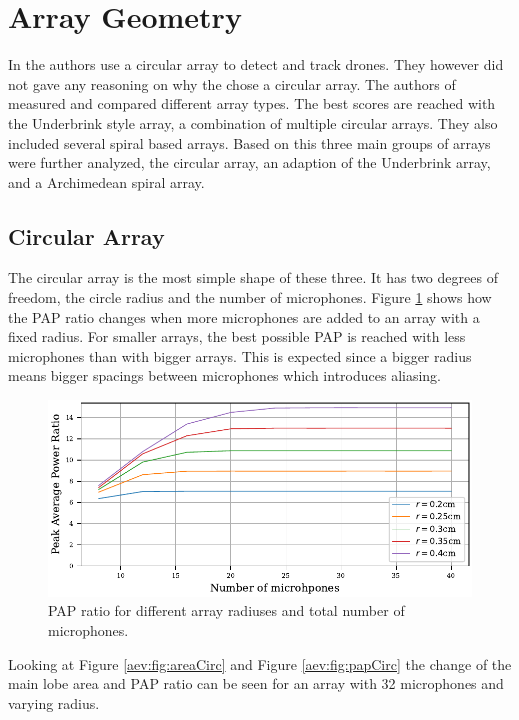 \section{Array Geometry}
In \cite{GuiAhmad} the authors use a circular array to detect and track drones.
They however did not gave any reasoning on why the chose a circular array.
The authors of \cite{array_comp} measured and compared different array types.
The best scores are reached with the Underbrink style array, a combination
of multiple circular arrays.
They also included several spiral based arrays.
Based on this three main groups of arrays were further analyzed,
the circular array, an adaption of the Underbrink array, and a Archimedean
spiral array.

\newpage
\subsection{Circular Array}
The circular array is the most simple shape of these three.
It has two degrees of freedom, the circle radius and the number of microphones.
Figure \ref{aev:fig:MicCirc} shows how the PAP ratio changes when
more microphones are added to an array with a fixed radius.
For smaller arrays, the best possible PAP is reached with less
microphones than with bigger arrays.
This is expected since a bigger radius means bigger spacings between microphones
which introduces aliasing.
\begin{figure}[h]
	\centering
	\includegraphics[width=1.0\textwidth, trim={0 0.2cm 0 0.2cm}]{images/5_array_evaluation/circ_m_pap.pdf}
	\caption{PAP ratio for different array radiuses and total number
		of microphones.}
	\label{aev:fig:MicCirc}
\end{figure}
\vspace{-0.3cm}
Looking at Figure \ref{aev:fig:areaCirc} and Figure \ref{aev:fig:papCirc}
the change of the main lobe area and PAP ratio can be seen for
an array with 32 microphones and varying radius.
